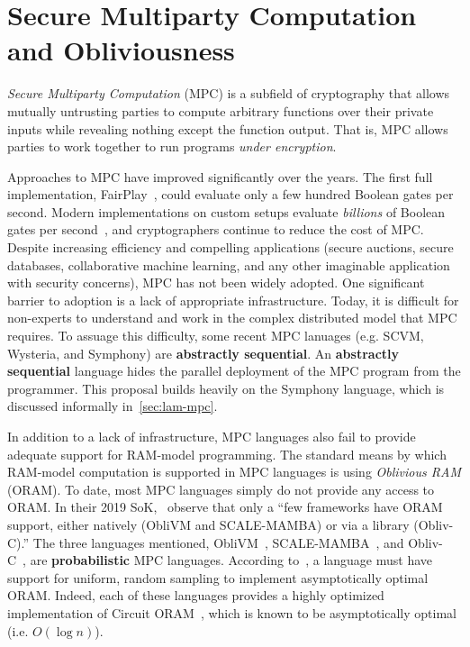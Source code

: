 \documentclass{report}
\begin{document}
\section{Secure Multiparty Computation and Obliviousness}
\label{sec:intro}

\emph{Secure Multiparty Computation} (MPC) is a subfield of cryptography
that allows mutually untrusting parties to compute arbitrary functions over their private inputs while revealing nothing
except the function output. That is, MPC allows parties to work together to run programs \emph{under encryption}.

Approaches to MPC have improved significantly over the years. The first full implementation, FairPlay~\cite{todo}, could evaluate
only a few hundred Boolean gates per second. Modern implementations on custom setups evaluate \emph{billions} of Boolean gates per
second~\cite{todo}, and cryptographers continue to reduce the cost of MPC. Despite increasing efficiency and compelling applications
(secure auctions, secure databases, collaborative machine learning, and any other imaginable application with security concerns),
MPC has not been widely adopted. One significant barrier to adoption is a lack of appropriate infrastructure. Today, it is difficult
for non-experts to understand and work in the complex distributed model that MPC requires. To assuage this difficulty, some recent
MPC lanuages (e.g. SCVM, Wysteria, and Symphony) are \textbf{abstractly sequential}. An \textbf{abstractly sequential} language hides
the parallel deployment of the MPC program from the programmer. This proposal builds heavily on the Symphony language, which is
discussed informally in~\cref{sec:lam-mpc}.


In addition to a lack of infrastructure, MPC languages also fail to provide adequate support for RAM-model programming.
The standard means by which RAM-model computation is supported in MPC languages is using \emph{Oblivious RAM} (ORAM). To date, most MPC languages
simply do not provide any access to ORAM. In their 2019 SoK,~\citet{todo} observe that only a ``few frameworks have ORAM support, either
natively (ObliVM and SCALE-MAMBA) or via a library (Obliv-C).'' The three languages mentioned, ObliVM~\cite{todo}, SCALE-MAMBA~\cite{todo}, and
Obliv-C~\cite{todo}, are \textbf{probabilistic} MPC languages. According to~\citet{todo}, a language must have support for uniform, random sampling
to implement asymptotically optimal ORAM. Indeed, each of these languages provides a highly optimized implementation of
Circuit ORAM~\cite{todo}, which is known to be asymptotically optimal (i.e. $O(\log{n})$).
\end{document}
